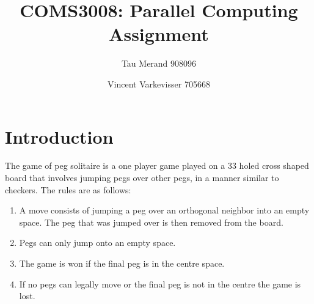 \documentclass[12pt,a4paper]{report}
\begin{document}
\parindent0pt

\title{COMS3008: Parallel Computing Assignment}
\author{Tau Merand 908096 \and Vincent Varkevisser 705668}
\maketitle
\section*{Introduction}
The game of peg solitaire is a one player game played on a 33 holed cross shaped board that involves jumping pegs over other pegs, in a manner similar to checkers. The rules are as follows:
\begin{enumerate}
  \item A move consists of jumping a peg over an orthogonal neighbor into an empty space. The peg that was jumped over is then removed from the board.
  \item Pegs can only jump onto an empty space.
  \item The game is won if the final peg is in the centre space.
  \item If no pegs can legally move or the final peg is not in the centre the game is lost.
\end{enumerate}
\end{document}
